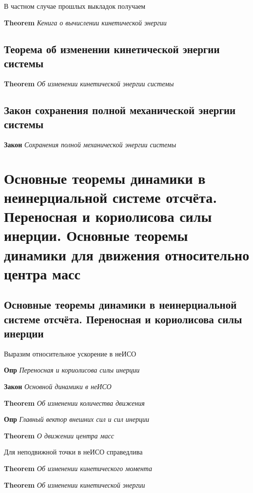 \documentclass[a4paper, 14pt]{article}
\begin{document}
    В частном случае прошлых выкладок получаем
    
    \textbf{Theorem} \textit{Кенига о вычислении кинетической энергии}
    
    \subsection{Теорема об изменении кинетической энергии системы}
    
    \textbf{Theorem} \textit{Об изменении кинетической энергии системы}
    
    \subsection{Закон сохранения полной механической энергии системы}
    
    \textbf{Закон} \textit{Сохранения полной механической энергии системы}
    
    \section{Основные теоремы динамики в неинерциальной системе отсчёта.
    Переносная и кориолисова силы инерции.
Основные теоремы динамики для движения относительно центра масс}
    
    \subsection{Основные теоремы динамики в неинерциальной системе отсчёта. Переносная и кориолисова силы инерции}
    
    Выразим относительное ускорение в неИСО
    
    \textbf{Опр} \textit{Переносная и кориолисова силы инерции}
    
    \textbf{Закон} \textit{Основной динамики в неИСО}
    
    \textbf{Theorem} \textit{Об изменении количества движения}
    
    \textbf{Опр} \textit{Главный вектор внешних сил и сил инерции}
    
    \textbf{Theorem} \textit{О движении центра масс}
    
    Для неподвижной точки в неИСО справедлива
    
    \textbf{Theorem} \textit{Об изменении кинетического момента}
    
    \textbf{Theorem} \textit{Об изменении кинетической энергии}
    
\end{document}
